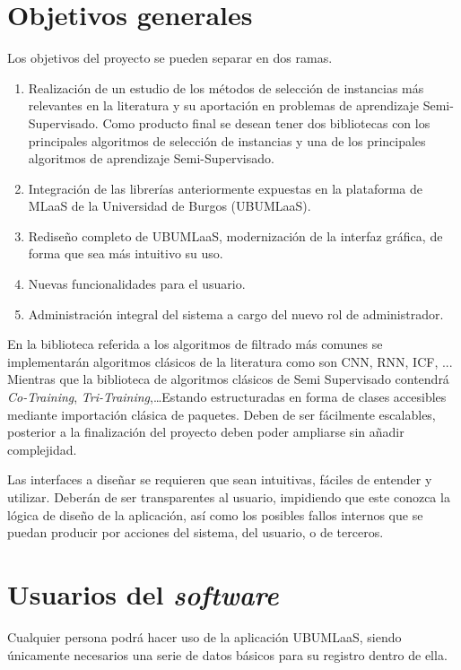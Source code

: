 \section{Objetivos generales}\label{objetivos-generales}
Los objetivos del proyecto se pueden separar en dos ramas.
\begin{enumerate}
\item Realización de un estudio de los métodos de selección de instancias más relevantes en la literatura y su aportación en problemas de aprendizaje Semi-Supervisado. Como producto final se desean tener dos bibliotecas con los principales algoritmos de selección de instancias y una de los principales algoritmos de aprendizaje Semi-Supervisado.
\item Integración de las librerías anteriormente expuestas en la plataforma de MLaaS de la Universidad de Burgos (UBUMLaaS).
\item Rediseño completo de UBUMLaaS, modernización de la interfaz gráfica, de forma que sea más intuitivo su uso.
\item Nuevas funcionalidades para el usuario.
\item Administración integral del sistema a cargo del nuevo rol de administrador.
\end{enumerate}

En la biblioteca referida a los algoritmos de filtrado más comunes se implementarán algoritmos clásicos de la literatura como son CNN, RNN, ICF, ... Mientras que la biblioteca de algoritmos clásicos de Semi Supervisado contendrá \textit{Co-Training}, \textit{Tri-Training},\dots Estando estructuradas en forma de clases accesibles mediante importación clásica de paquetes. Deben de ser fácilmente escalables, posterior a la finalización del proyecto deben poder ampliarse sin añadir complejidad.

Las interfaces a diseñar se requieren que sean intuitivas, fáciles de entender y utilizar. Deberán de ser transparentes al usuario, impidiendo que este conozca la lógica de diseño de la aplicación, así como los posibles fallos internos que se puedan producir por acciones del sistema, del usuario, o de terceros.


\section{Usuarios del \textit{software}}\label{usuarios-participantes-software}
Cualquier persona podrá hacer uso de la aplicación UBUMLaaS, siendo únicamente necesarios una serie de datos básicos para su registro dentro de ella. 

